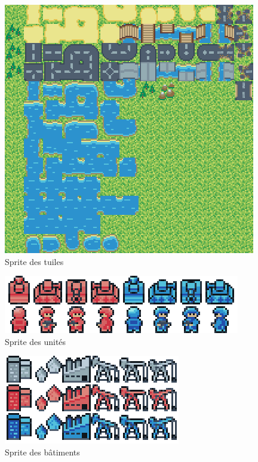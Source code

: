 \begin{figure}[h]
    \centering
    \includegraphics[scale = 1]{images/mapTileset.png}
    \caption{Sprite des tuiles}
    \label{fig:Advance Wars}
\end{figure}

\begin{figure}[h]
    \centering
    \includegraphics[scale = 1]{images/units.png}
    \caption{Sprite des unités}
    \label{fig:Advance Wars}
\end{figure}

\begin{figure}[h]
    \centering
    \includegraphics[scale = 1]{images/buildings.png}
    \caption{Sprite des bâtiments}
    \label{fig:Advance Wars}
\end{figure}

\clearpage

